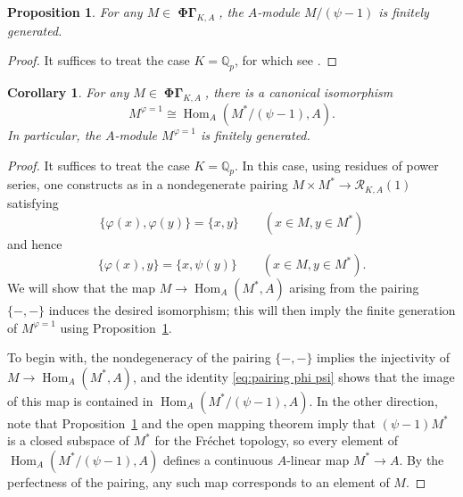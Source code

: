 \documentclass[12pt]{amsart}
\newtheorem{cor}[theorem]{Corollary}
\newtheorem{prop}[theorem]{Proposition}
\theoremstyle{definition}
\numberwithin{equation}{theorem}
\newcommand{\QQ}{\mathbb{Q}}
\newcommand{\calR}{\mathcal{R}}
\DeclareMathOperator{\Hom}{Hom}
\DeclareMathOperator{\PhiGamma}{\mathbf{\Phi \Gamma}}
\begin{document}
\begin{prop} \label{P:psi finite}
For any $M \in \PhiGamma_{K,A}$,
the $A$-module $M/(\psi-1)$ is finitely generated.
\end{prop}
\begin{proof}
It suffices to treat the case $K = \QQ_p$, for which see \cite[Proposition~3.3.2(1)]{kpx}.
\end{proof}

\begin{cor}
For any $M \in \PhiGamma_{K,A}$, there is a canonical isomorphism
\[
M^{\varphi=1} \cong \Hom_A(M^*/(\psi-1), A).
\]
In particular, the $A$-module $M^{\varphi=1}$ is finitely generated.
\end{cor}
\begin{proof}
It suffices to treat the case $K = \QQ_p$.
In this case, using residues of power series, one constructs as in \cite[Notation~2.3.13]{kpx} a nondegenerate pairing $M \times M^* \to \calR_{K,A}(1)$ satisfying
\[
\{\varphi(x), \varphi(y)\} = \{x, y\} \qquad (x \in M, y \in M^*)
\]
and hence
\begin{equation}
 \label{eq:pairing phi psi}
\{\varphi(x), y\}= \{x, \psi(y)\} \qquad (x \in M, y \in M^*).
\end{equation}
We will show that the map $M \to \Hom_A(M^*, A)$ arising from the pairing $\{-,-\}$ induces the desired isomorphism; this will then imply the finite generation of $M^{\varphi=1}$
using Proposition~\ref{P:psi finite}.

To begin with, the nondegeneracy of the pairing $\{-, -\}$ implies the injectivity of $M \to \Hom_A(M^*, A)$, and
the identity \eqref{eq:pairing phi psi} shows that the image of this map is contained in
$\Hom_A(M^*/(\psi-1), A)$. In the other direction, note that Proposition~\ref{P:psi finite} and the open mapping theorem imply that $(\psi-1)M^*$ is a closed subspace of $M^*$
for the Fr\'echet topology, so every element of $\Hom_A(M^*/(\psi-1), A)$ defines a continuous $A$-linear map $M^* \to A$. By the perfectness of the pairing,
any such map corresponds to an element of $M$.
\end{proof}
\end{document}
